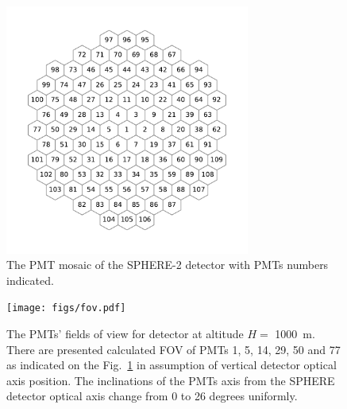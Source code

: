 \documentclass[final,5p,times,twocolumn]{elsarticle}
\begin{document}
\begin{figure}[tb]
\centering
    \includegraphics[width=19pc]{figs/mosaic.pdf}%
    \vspace{-1.0pc}
    \caption{The PMT mosaic of the SPHERE-2 detector with PMTs numbers indicated.}
\label{fig:mosaic}
\end{figure}


\begin{figure}[bth]
\centering
    \texttt{[image: figs/fov.pdf]}
    \caption{The PMTs' fields of view for detector at altitude $H=$ 1000~m. There are presented calculated FOV of PMTs 1, 5, 14, 29, 50 and 77 as indicated on the Fig.~\ref{fig:mosaic} in assumption of vertical detector optical axis position. The inclinations of the PMTs axis from the SPHERE detector optical axis change from 0 to 26 degrees uniformly.}
\label{fig:pmt_fov}
\end{figure}
\end{document}

